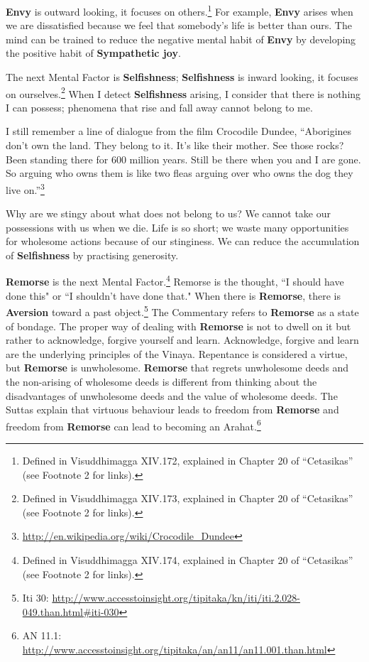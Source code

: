 \textbf{Envy} is outward looking, it focuses on others.\footnote{Defined in Visuddhimagga XIV.172, explained in Chapter 20 of “Cetasikas” (see Footnote 2 for links).} For example, \textbf{Envy} arises when we are dissatisfied because we feel that somebody’s life is better than ours. The mind can be trained to reduce the negative mental habit of \textbf{Envy} by developing the positive habit of \textbf{Sympathetic joy}.

The next Mental Factor is \textbf{Selfishness}; \textbf{Selfishness} is inward looking, it focuses on ourselves.\footnote{Defined in Visuddhimagga XIV.173, explained in Chapter 20 of “Cetasikas” (see Footnote 2 for links).} When I detect \textbf{Selfishness} arising, I consider that there is nothing I can possess; phenomena that rise and fall away cannot belong to me.

I still remember a line of dialogue from the film Crocodile Dundee, “Aborigines don’t own the land. They belong to it. It’s like their mother. See those rocks? Been standing there for 600 million years. Still be there when you and I are gone. So arguing who owns them is like two fleas arguing over who owns the dog they live on.”\footnote{\url{http://en.wikipedia.org/wiki/Crocodile_Dundee}}

Why are we stingy about what does not belong to us? We cannot take our possessions with us when we die. Life is so short; we waste many opportunities for wholesome actions because of our stinginess. We can reduce the accumulation of \textbf{Selfishness} by practising generosity.

\textbf{Remorse} is the next Mental Factor.\footnote{Defined in Visuddhimagga XIV.174, explained in Chapter 20 of “Cetasikas” (see Footnote 2 for links).} Remorse is the thought, ``I should have done this" or ``I shouldn't have done that." When there is \textbf{Remorse}, there is \textbf{Aversion} toward a past object.\footnote{Iti 30: \url{http://www.accesstoinsight.org/tipitaka/kn/iti/iti.2.028-049.than.html\#iti-030}} The Commentary refers to \textbf{Remorse} as a state of bondage. The proper way of dealing with \textbf{Remorse} is not to dwell on it but rather to acknowledge, forgive yourself and learn. Acknowledge, forgive and learn are the underlying principles of the Vinaya. Repentance is considered a virtue, but \textbf{Remorse} is unwholesome. \textbf{Remorse} that regrets unwholesome deeds and the non-arising of wholesome deeds is different from thinking about the disadvantages of unwholesome deeds and the value of wholesome deeds. The Suttas explain that virtuous behaviour leads to freedom from \textbf{Remorse} and freedom from \textbf{Remorse} can lead to becoming an Arahat.\footnote{AN 11.1: \url{http://www.accesstoinsight.org/tipitaka/an/an11/an11.001.than.html}}

